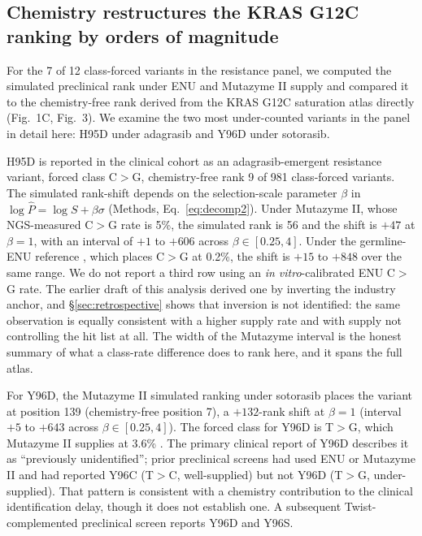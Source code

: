 \documentclass[11pt,a4paper]{article}
\begin{document}
\subsection{Chemistry restructures the KRAS G12C ranking by orders of magnitude}
\label{sec:kras-rankshift}

For the 7 of 12 class-forced variants in the resistance panel, we
computed the simulated preclinical rank under ENU and Mutazyme II supply
and compared it to the chemistry-free rank derived from the KRAS G12C
saturation atlas directly (Fig.~1C, Fig.~3). We examine the two most
under-counted variants in the panel in detail here: H95D under
adagrasib and Y96D under sotorasib.

H95D is reported in the clinical cohort \citep{awad2021} as an
adagrasib-emergent resistance variant, forced class C$>$G,
chemistry-free rank 9 of 981 class-forced variants. The simulated
rank-shift depends on the selection-scale parameter $\beta$ in
$\log \hat P = \log S + \beta\sigma$ (Methods, Eq.~\ref{eq:decomp2}).
Under Mutazyme II, whose NGS-measured C$>$G rate is 5\%, the simulated
rank is 56 and the shift is $+47$ at $\beta = 1$, with an interval of
$+1$ to $+606$ across $\beta \in [0.25, 4]$. Under the germline-ENU
reference \citep{arnold2012}, which places C$>$G at 0.2\%, the shift is
$+15$ to $+848$ over the same range. We do not report a third row
using an \emph{in vitro}-calibrated ENU C$>$G rate. The earlier draft
of this analysis derived one by inverting the industry anchor, and
\S\ref{sec:retrospective} shows that inversion is not identified: the
same observation is equally consistent with a higher supply rate and
with supply not controlling the hit list at all. The width of the
Mutazyme interval is the honest summary of what a class-rate
difference does to rank here, and it spans the full atlas.

For Y96D, the Mutazyme II simulated ranking under sotorasib places the
variant at position 139 (chemistry-free position 7), a $+132$-rank
shift at $\beta = 1$ (interval $+5$ to $+643$ across $\beta \in [0.25, 4]$).
The forced class for Y96D is T$>$G, which Mutazyme II supplies at
3.6\% \citep{doi2022}. The primary clinical report of Y96D
\citep{tanaka2021} describes it as ``previously unidentified''; prior
preclinical screens had used ENU or Mutazyme II and had reported Y96C
(T$>$C, well-supplied) but not Y96D (T$>$G, under-supplied). That
pattern is consistent with a chemistry contribution to the clinical
identification delay, though it does not establish one. A subsequent
Twist-complemented preclinical screen \citep{tang2022boehringer}
reports Y96D and Y96S.
\end{document}

